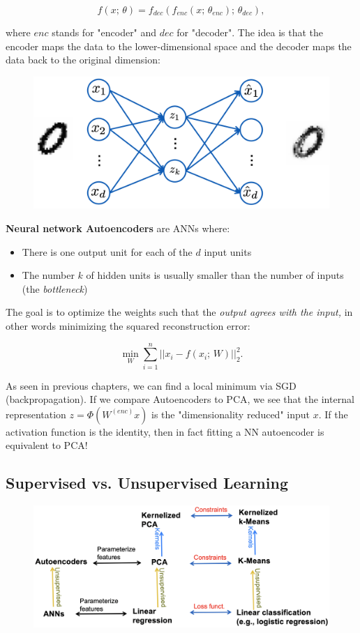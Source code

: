 \documentclass[a4paper]{extarticle}
\begin{document}
\[
    f(x; \, \theta) = f_{dec}(f_{enc}(x; \, \theta_{enc}); \, \theta_{dec}),
\]

where $enc$ stands for "encoder" and $dec$ for "decoder". The idea is that the encoder maps the data to the lower-dimensional space and the decoder maps the data back to the original dimension:

\begin{figure}[H]
    \includegraphics[width=15cm]{../images/IntroML_Fig9-2}
    \centering
\end{figure}

\textbf{Neural network Autoencoders} are ANNs where:
\begin{itemize}
    \item There is one output unit for each of the $d$ input units
    \item The number $k$ of hidden units is usually smaller than the number of inputs (the \textit{bottleneck})
\end{itemize}
The goal is to optimize the weights such that the \textit{output agrees with the input,} in other words minimizing the squared reconstruction error:

\[
    \min_W \sum_{i = 1}^n ||x_i - f(x_i; \, W)||_2^2.
\]

As seen in previous chapters, we can find a local minimum via SGD (backpropagation). If we compare Autoencoders to PCA, we see that the internal representation $z = \varPhi(W^{(enc)}x)$ is the "dimensionality reduced" input $x$. If the activation function is the identity, then in fact fitting a NN autoencoder is equivalent to PCA!

\subsection{Supervised vs. Unsupervised Learning}

\begin{figure}[H]
    \includegraphics[width=15cm]{../images/IntroML_Fig9-3}
    \centering
\end{figure}
\end{document}
